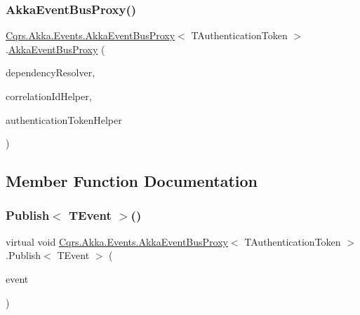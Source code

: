 \subsubsection{\texorpdfstring{Akka\+Event\+Bus\+Proxy()}{AkkaEventBusProxy()}}
{\footnotesize\ttfamily \hyperlink{classCqrs_1_1Akka_1_1Events_1_1AkkaEventBusProxy}{Cqrs.\+Akka.\+Events.\+Akka\+Event\+Bus\+Proxy}$<$ T\+Authentication\+Token $>$.\hyperlink{classCqrs_1_1Akka_1_1Events_1_1AkkaEventBusProxy}{Akka\+Event\+Bus\+Proxy} (\begin{DoxyParamCaption}\item[{\hyperlink{interfaceCqrs_1_1Configuration_1_1IDependencyResolver}{I\+Dependency\+Resolver}}]{dependency\+Resolver,  }\item[{I\+Correlation\+Id\+Helper}]{correlation\+Id\+Helper,  }\item[{\hyperlink{interfaceCqrs_1_1Authentication_1_1IAuthenticationTokenHelper}{I\+Authentication\+Token\+Helper}$<$ T\+Authentication\+Token $>$}]{authentication\+Token\+Helper }\end{DoxyParamCaption})}



\subsection{Member Function Documentation}
\mbox{\label{classCqrs_1_1Akka_1_1Events_1_1AkkaEventBusProxy_a656daead2fe6f30487855dbaea5a3c83_a656daead2fe6f30487855dbaea5a3c83}} 
\subsubsection{\texorpdfstring{Publish$<$ T\+Event $>$()}{Publish< TEvent >()}\hspace{0.1cm}{\footnotesize\ttfamily [1/2]}}
{\footnotesize\ttfamily virtual void \hyperlink{classCqrs_1_1Akka_1_1Events_1_1AkkaEventBusProxy}{Cqrs.\+Akka.\+Events.\+Akka\+Event\+Bus\+Proxy}$<$ T\+Authentication\+Token $>$.Publish$<$ T\+Event $>$ (\begin{DoxyParamCaption}\item[{T\+Event @}]{event }\end{DoxyParamCaption})\hspace{0.3cm}{\ttfamily [virtual]}}



